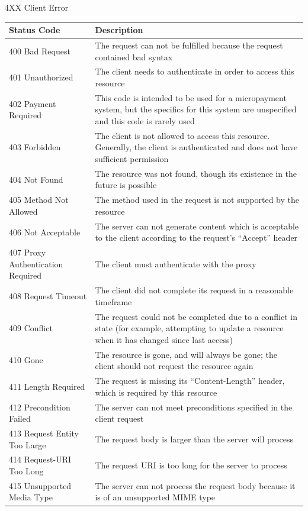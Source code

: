\documentclass[final]{beamer}
\begin{document}
\begin{frame}{}
\begin{block}{\huge 4XX Client Error}
      \begin{tabular}{p{} p{}}
        Status Code & Description \\ \hline
        400 Bad Request & The request can not be fulfilled because the request contained bad syntax \\
        401 Unauthorized & The client needs to authenticate in order to access this resource \\
        402 Payment Required & This code is intended to be used for a micropayment system, but the specifics for this system are unspecified and this code is rarely used \\
        403 Forbidden & The client is not allowed to access this resource. Generally, the client is authenticated and does not have sufficient permission \\
        404 Not Found & The resource was not found, though its existence in the future is possible \\
        405 Method Not Allowed & The method used in the request is not supported by the resource \\
        406 Not Acceptable & The server can not generate content which is acceptable to the client according to the request's ``Accept'' header \\
        407 Proxy Authentication Required & The client must authenticate with the proxy \\
        408 Request Timeout & The client did not complete its request in a reasonable timeframe \\
        409 Conflict & The request could not be completed due to a conflict in state (for example, attempting to update a resource when it has changed since last access) \\
        410 Gone & The resource is gone, and will always be gone; the client should not request the resource again \\
        411 Length Required & The request is missing its ``Content-Length'' header, which is required by this resource \\
        412 Precondition Failed & The server can not meet preconditions specified in the client request \\
        413 Request Entity Too Large & The request body is larger than the server will process \\
        414 Request-URI Too Long & The request URI is too long for the server to process \\
        415 Unsupported Media Type & The server can not process the request body because it is of an unsupported MIME type \\

\end{tabular}
\end{block}
\end{frame}
\end{document}
